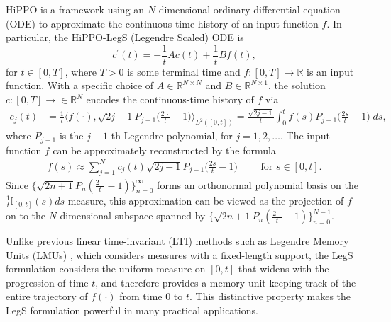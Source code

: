 \documentclass{article}
\theoremstyle{definition}
\newcommand{\derivative}[1]{#1^{\prime}}
\begin{document}
HiPPO is a framework using an $N$-dimensional ordinary differential equation (ODE) to approximate the continuous-time history of an input function $f$.
In particular, the HiPPO-LegS (Legendre Scaled) ODE is
\[
\derivative{c}(t) = -\frac{1}{t}Ac(t) + \frac{1}{t}Bf(t),
\] 
for $t\in [0,T]$, where $T>0$ is some terminal time and $f \colon  [0,T] \to \mathbb{R}$ is an input function.
With a specific choice of $A \in \mathbb R^{N \times N}$ and $B \in \mathbb R^{N \times 1}$, the solution $c\colon [0,T]\rightarrow \in \mathbb{R}^N$ encodes the continuous-time history of $f$ via
\begin{align*} 
    c_j(t) &= \frac{1}{t} \Big\langle f(\cdot ), \sqrt{2j-1} P_{j-1}\big(\tfrac{2\,\cdot} {t}-1\big) \Big\rangle_{L^2([0,t])}
    =
    \frac{\sqrt{2j-1}}{t} \int_0^t f(s) P_{j-1}\big(\tfrac{2s} {t}-1\big) \;ds,
\end{align*}
where $P_{j-1}$ is the $j-1$-th Legendre polynomial, for $j=1,2,\dots$.
The input function $f$ can be approximately reconstructed by the formula
\begin{align*}
    f(s) \approx \sum_{j=1}^Nc_j(t) \sqrt{2j-1} P_{j-1}\big(\tfrac{2s}{t}-1\big)\qquad\text{ for }s\in [0,t].
\end{align*}
Since $\{ \sqrt{2n+1} P_n(\frac{2\,\cdot}{t}-1)\}_{n=0}^\infty$ forms an
orthonormal polynomial basis on the $\frac{1}{t} \mathbb{I}_{[0,t]}(s)ds$ measure, this approximation can be viewed as the projection of $f$ on to the $N$-dimensional subspace spanned by $\{\sqrt{2n+1} P_n(\frac{2\,\cdot}{t}-1)\}_{n=0}^{N-1}$.



Unlike previous linear time-invariant (LTI) methods such as Legendre Memory Units (LMUs) \citep{voelker2019legendre}, which considers measures with a fixed-length support, the LegS formulation considers the uniform measure on $[0,t]$ that widens with the progression of time $t$, and therefore provides a memory unit keeping track of the entire trajectory of $f(\cdot)$ from time $0$ to $t$.
This distinctive property makes the LegS formulation powerful in many practical applications.
\end{document}
